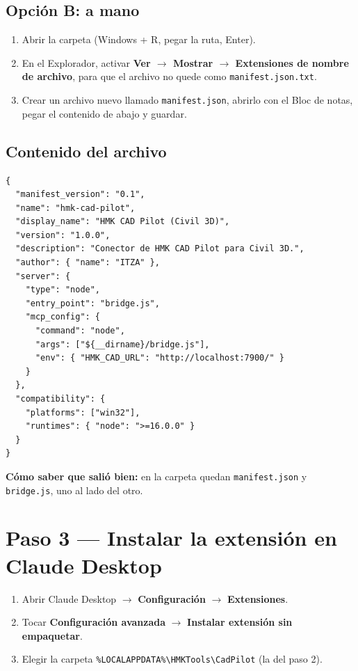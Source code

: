 \documentclass[12pt, a4paper]{article}
\begin{document}
\subsection*{Opción B: a mano}

\begin{enumerate}[itemsep=2pt]
  \item Abrir la carpeta (Windows + R, pegar la ruta, Enter).
  \item En el Explorador, activar \textbf{Ver $\rightarrow$ Mostrar $\rightarrow$ Extensiones de nombre de archivo},
  para que el archivo no quede como \texttt{manifest.json.txt}.
  \item Crear un archivo nuevo llamado \texttt{manifest.json}, abrirlo con el Bloc de notas,
  pegar el contenido de abajo y guardar.
\end{enumerate}

\subsection*{Contenido del archivo}

\begin{Verbatim}[fontsize=\small, frame=single, framesep=3mm]
{
  "manifest_version": "0.1",
  "name": "hmk-cad-pilot",
  "display_name": "HMK CAD Pilot (Civil 3D)",
  "version": "1.0.0",
  "description": "Conector de HMK CAD Pilot para Civil 3D.",
  "author": { "name": "ITZA" },
  "server": {
    "type": "node",
    "entry_point": "bridge.js",
    "mcp_config": {
      "command": "node",
      "args": ["${__dirname}/bridge.js"],
      "env": { "HMK_CAD_URL": "http://localhost:7900/" }
    }
  },
  "compatibility": {
    "platforms": ["win32"],
    "runtimes": { "node": ">=16.0.0" }
  }
}
\end{Verbatim}

\textbf{Cómo saber que salió bien:} en la carpeta quedan \texttt{manifest.json} y
\texttt{bridge.js}, uno al lado del otro.

\section*{Paso 3 --- Instalar la extensión en Claude Desktop}

\begin{enumerate}[itemsep=2pt]
  \item Abrir Claude Desktop $\rightarrow$ \textbf{Configuración} $\rightarrow$ \textbf{Extensiones}.
  \item Tocar \textbf{Configuración avanzada} $\rightarrow$ \textbf{Instalar extensión sin empaquetar}.
  \item Elegir la carpeta
  \texttt{\%LOCALAPPDATA\%\textbackslash HMKTools\textbackslash CadPilot} (la del paso 2).
\end{enumerate}
\end{document}
